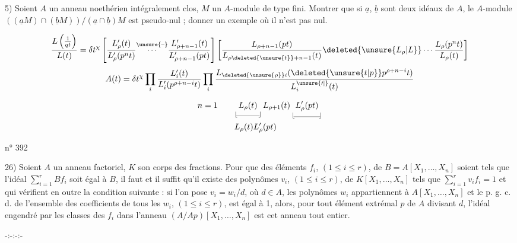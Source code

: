 5) Soient $A$ un anneau noethérien intégralement clos, $M$ un $A$-module de type fini. Montrer que si $\underline{a}$, $\underline{b}$ sont deux idéaux de $A$, le $A$-module $((\underline{a} M)\cap(\underline{b} M))/(\underline{a}\cap\underline{b})M$ est pseudo-nul ; donner un exemple où il n'est pas nul.


\[
\frac{L\left(\frac{1}{qt}\right)}{L(t)}=\delta t^\chi
\left[\frac{L'_\rho(t)}{L'_\rho(p^nt)}\overset{\unsure{\text{--}}}{\cdots}
\frac{L'_{\rho+n-1}(t)}{L'_{\rho+n-1}(pt)}\right]
\left[\frac{L_{\rho+n-1}(pt)}{L_{\rho\deleted{\unsure{t}}+n-1}(t)}
\deleted{\unsure{L_\rho|L}}\cdots
\frac{L_\rho(p^nt)}{L_\rho(t)}\right]
\]
\[
A(t)=\delta t^\chi\prod_i\frac{L'_i(t)}{L'_i(p^{\rho+n-i}t)}
\prod_i\frac{L_{\deleted{\unsure{\rho}}i}(\deleted{\unsure{t|p}}p^{\rho+n-i}t)}{L_i^{\unsure{\prime|{}}}(t)}
\]

\[
\begin{aligned}
n=1\qquad &\underset{\lfloor\!\rule{2.8em}{.3pt}\!\rfloor}{L_\rho(t)}\,L_{\rho+1}(t)\,\underset{\lfloor\!\rule{3.2em}{.3pt}\!\rfloor}{L'_\rho(pt)}\\
&L_\rho(t)L'_\rho(pt)
\end{aligned}
\]

\hfill n° 392

26) Soient $A$ un anneau factoriel, $K$ son corps des fractions. Pour que des éléments $f_i$, $(1\leq i\leq r)$, de $B=A[X_1,\ldots,X_n]$ soient tels que l'idéal $\sum_{i=1}^{r}Bf_i$ soit égal à $B$, il faut et il suffit qu'il existe des polynômes $v_i$, $(1\leq i\leq r)$, de $K[X_1,\ldots,X_n]$ tels que $\sum_{i=1}^{r}v_i f_i=1$ et qui vérifient en outre la condition suivante : si l'on pose $v_i=w_i/d$, où $d\in A$, les polynômes $w_i$ appartiennent à $A[X_1,\ldots,X_n]$ et le p. g. c. d. de l'ensemble des coefficients de tous les $w_i$, $(1\leq i\leq r)$, est égal à 1, alors, pour tout élément extrémal $p$ de $A$ divisant $d$, l'idéal engendré par les classes des $f_i$ dans l'anneau $(A/Ap)[X_1,\ldots,X_n]$ est cet anneau tout entier.

\begin{center}
-:-:-:-
\end{center}
